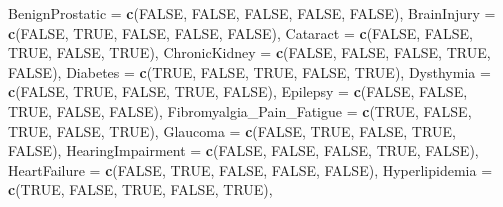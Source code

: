 \documentclass[
]{article}
\newenvironment{Shaded}{\begin{snugshade}}{\end{snugshade}}
\newcommand{\AttributeTok}[1]{\textcolor[rgb]{0.13,0.29,0.53}{#1}}
\newcommand{\ConstantTok}[1]{\textcolor[rgb]{0.56,0.35,0.01}{#1}}
\newcommand{\FunctionTok}[1]{\textcolor[rgb]{0.13,0.29,0.53}{\textbf{#1}}}
\newcommand{\NormalTok}[1]{#1}
\begin{document}
\begin{Shaded}
\begin{Highlighting}[]
  \AttributeTok{BenignProstatic =} \FunctionTok{c}\NormalTok{(}\ConstantTok{FALSE}\NormalTok{, }\ConstantTok{FALSE}\NormalTok{, }\ConstantTok{FALSE}\NormalTok{, }\ConstantTok{FALSE}\NormalTok{, }\ConstantTok{FALSE}\NormalTok{),}
  \AttributeTok{BrainInjury =} \FunctionTok{c}\NormalTok{(}\ConstantTok{FALSE}\NormalTok{, }\ConstantTok{TRUE}\NormalTok{, }\ConstantTok{FALSE}\NormalTok{, }\ConstantTok{FALSE}\NormalTok{, }\ConstantTok{FALSE}\NormalTok{),}
  \AttributeTok{Cataract =} \FunctionTok{c}\NormalTok{(}\ConstantTok{FALSE}\NormalTok{, }\ConstantTok{FALSE}\NormalTok{, }\ConstantTok{TRUE}\NormalTok{, }\ConstantTok{FALSE}\NormalTok{, }\ConstantTok{TRUE}\NormalTok{),}
  \AttributeTok{ChronicKidney =} \FunctionTok{c}\NormalTok{(}\ConstantTok{FALSE}\NormalTok{, }\ConstantTok{FALSE}\NormalTok{, }\ConstantTok{FALSE}\NormalTok{, }\ConstantTok{TRUE}\NormalTok{, }\ConstantTok{FALSE}\NormalTok{),}
  \AttributeTok{Diabetes =} \FunctionTok{c}\NormalTok{(}\ConstantTok{TRUE}\NormalTok{, }\ConstantTok{FALSE}\NormalTok{, }\ConstantTok{TRUE}\NormalTok{, }\ConstantTok{FALSE}\NormalTok{, }\ConstantTok{TRUE}\NormalTok{),}
  \AttributeTok{Dysthymia =} \FunctionTok{c}\NormalTok{(}\ConstantTok{FALSE}\NormalTok{, }\ConstantTok{TRUE}\NormalTok{, }\ConstantTok{FALSE}\NormalTok{, }\ConstantTok{TRUE}\NormalTok{, }\ConstantTok{FALSE}\NormalTok{),}
  \AttributeTok{Epilepsy =} \FunctionTok{c}\NormalTok{(}\ConstantTok{FALSE}\NormalTok{, }\ConstantTok{FALSE}\NormalTok{, }\ConstantTok{TRUE}\NormalTok{, }\ConstantTok{FALSE}\NormalTok{, }\ConstantTok{FALSE}\NormalTok{),}
  \AttributeTok{Fibromyalgia\_Pain\_Fatigue =} \FunctionTok{c}\NormalTok{(}\ConstantTok{TRUE}\NormalTok{, }\ConstantTok{FALSE}\NormalTok{, }\ConstantTok{TRUE}\NormalTok{, }\ConstantTok{FALSE}\NormalTok{, }\ConstantTok{TRUE}\NormalTok{),}
  \AttributeTok{Glaucoma =} \FunctionTok{c}\NormalTok{(}\ConstantTok{FALSE}\NormalTok{, }\ConstantTok{TRUE}\NormalTok{, }\ConstantTok{FALSE}\NormalTok{, }\ConstantTok{TRUE}\NormalTok{, }\ConstantTok{FALSE}\NormalTok{),}
  \AttributeTok{HearingImpairment =} \FunctionTok{c}\NormalTok{(}\ConstantTok{FALSE}\NormalTok{, }\ConstantTok{FALSE}\NormalTok{, }\ConstantTok{FALSE}\NormalTok{, }\ConstantTok{TRUE}\NormalTok{, }\ConstantTok{FALSE}\NormalTok{),}
  \AttributeTok{HeartFailure =} \FunctionTok{c}\NormalTok{(}\ConstantTok{FALSE}\NormalTok{, }\ConstantTok{TRUE}\NormalTok{, }\ConstantTok{FALSE}\NormalTok{, }\ConstantTok{FALSE}\NormalTok{, }\ConstantTok{FALSE}\NormalTok{),}
  \AttributeTok{Hyperlipidemia =} \FunctionTok{c}\NormalTok{(}\ConstantTok{TRUE}\NormalTok{, }\ConstantTok{FALSE}\NormalTok{, }\ConstantTok{TRUE}\NormalTok{, }\ConstantTok{FALSE}\NormalTok{, }\ConstantTok{TRUE}\NormalTok{),}

\end{Highlighting}
\end{Shaded}
\end{document}
